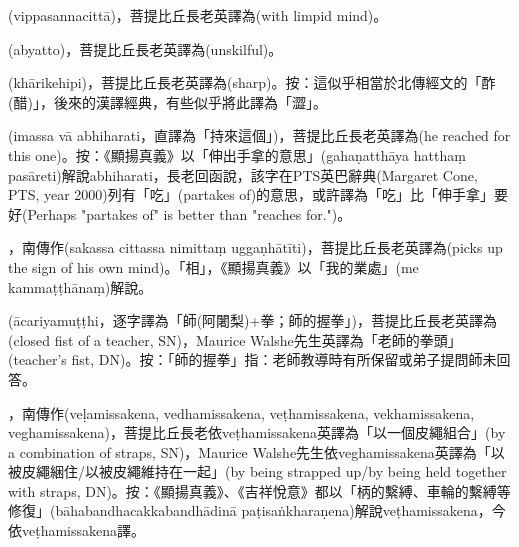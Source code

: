 \startitemgroup[noteitems]
\item{}(vippasannacittā)，菩提比丘長老英譯為(with limpid mind)。
\stopitemgroup

\startitemgroup[noteitems]
\item{}(abyatto)，菩提比丘長老英譯為(unskilful)。
\stopitemgroup

\startitemgroup[noteitems]
\item{}(khārikehipi)，菩提比丘長老英譯為(sharp)。按：這似乎相當於北傳經文的「酢(醋)」，後來的漢譯經典，有些似乎將此譯為「澀」。
\stopitemgroup

\startitemgroup[noteitems]
\item{}(imassa vā abhiharati，直譯為「持來這個」)，菩提比丘長老英譯為(he reached for this one)。按：《顯揚真義》以「伸出手拿的意思」(gahaṇatthāya hatthaṃ pasāreti)解說abhiharati，長老回函說，該字在PTS英巴辭典(Margaret Cone, PTS, year 2000)列有「吃」(partakes of)的意思，或許譯為「吃」比「伸手拿」要好(Perhaps "partakes of" is better than "reaches for.")。
\stopitemgroup

\startitemgroup[noteitems]
\item{}，南傳作(sakassa cittassa nimittaṃ uggaṇhātīti)，菩提比丘長老英譯為(picks up the sign of his own mind)。「相」，《顯揚真義》以「我的業處」(me kammaṭṭhānaṃ)解說。
\stopitemgroup

\startitemgroup[noteitems]
\item{}(ācariyamuṭṭhi，逐字譯為「師(阿闍梨)+拳；師的握拳」)，菩提比丘長老英譯為(closed fist of a teacher, SN)，Maurice Walshe先生英譯為「老師的拳頭」(teacher's fist, DN)。按：「師的握拳」指：老師教導時有所保留或弟子提問師未回答。
\stopitemgroup

\startitemgroup[noteitems]
\item{}，南傳作(veḷamissakena, vedhamissakena, veṭhamissakena, vekhamissakena, veghamissakena)，菩提比丘長老依veṭhamissakena英譯為「以一個皮繩組合」(by a combination of straps, SN)，Maurice Walshe先生依veghamissakena英譯為「以被皮繩綑住/以被皮繩維持在一起」(by being strapped up/by being held together with straps, DN)。按：《顯揚真義》、《吉祥悅意》都以「柄的繫縛、車輪的繫縛等修復」(bāhabandhacakkabandhādinā paṭisaṅkharaṇena)解說veṭhamissakena，今依veṭhamissakena譯。
\stopitemgroup

